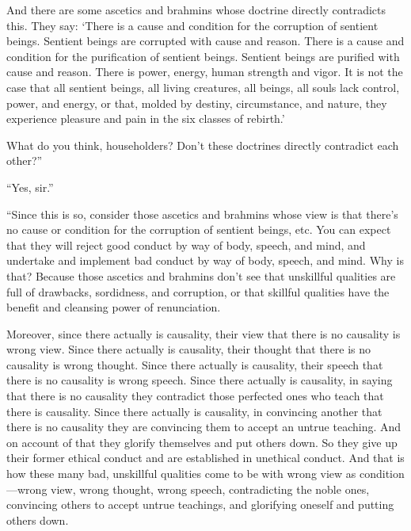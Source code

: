 \documentclass[12pt,openany]{book}%
\begin{document}
And there are some ascetics and brahmins whose doctrine directly contradicts this. They say: ‘There is a cause and condition for the corruption of sentient beings. Sentient beings are corrupted with cause and reason. There is a cause and condition for the purification of sentient beings. Sentient beings are purified with cause and reason. There is power, energy, human strength and vigor. It is not the case that all sentient beings, all living creatures, all beings, all souls lack control, power, and energy, or that, molded by destiny, circumstance, and nature, they experience pleasure and pain in the six classes of rebirth.’ 

What do you think, householders? Don’t these doctrines directly contradict each other?” 

“Yes, sir.” 

“Since this is so, consider those ascetics and brahmins whose view is that there’s no cause or condition for the corruption of sentient beings, etc. You can expect that they will reject good conduct by way of body, speech, and mind, and undertake and implement bad conduct by way of body, speech, and mind. Why is that? Because those ascetics and brahmins don’t see that unskillful qualities are full of drawbacks, sordidness, and corruption, or that skillful qualities have the benefit and cleansing power of renunciation. 

Moreover, since there actually is causality, their view that there is no causality is wrong view. Since there actually is causality, their thought that there is no causality is wrong thought. Since there actually is causality, their speech that there is no causality is wrong speech. Since there actually is causality, in saying that there is no causality they contradict those perfected ones who teach that there is causality. Since there actually is causality, in convincing another that there is no causality they are convincing them to accept an untrue teaching. And on account of that they glorify themselves and put others down. So they give up their former ethical conduct and are established in unethical conduct. And that is how these many bad, unskillful qualities come to be with wrong view as condition—wrong view, wrong thought, wrong speech, contradicting the noble ones, convincing others to accept untrue teachings, and glorifying oneself and putting others down. 
\end{document}
